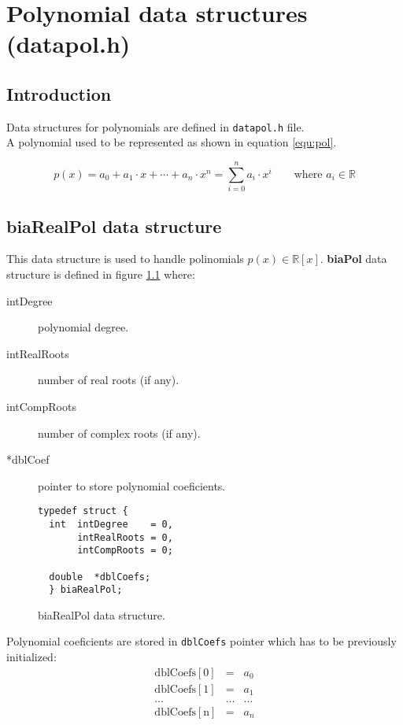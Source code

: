 %
%

\chapter{Polynomial data structures (datapol.h)}

\section{Introduction}

Data structures for polynomials are defined in \texttt{datapol.h} file.\\

A polynomial used to be represented as shown in equation \ref{equ:pol}.

\begin{equation} \label{equ:pol}
p(x) = a_0 + a_1 \cdot x + \cdots + a_n \cdot x^n = \sum_{i=0}^n a_i \cdot x^i \qquad \textrm{where } a_i \in \mathbb{R}
\end{equation}

\section{\textbf{biaRealPol} data structure} \label{sec:biaRealPol}

This data structure is used to handle polinomials $p(x) \in \mathbb{R}[x]$. \textbf{biaPol} data structure is defined in figure \ref{fig:biaRealPol} where:
%
\begin{description}
\item[intDegree] polynomial degree.
\item[intRealRoots] number of real roots (if any).
\item[intCompRoots] number of complex roots (if any).
\item[*dblCoef] pointer to store polynomial coeficients.
\end{description}
%
\begin{figure}[!h]
\begin{verbatim}
typedef struct {
  int  intDegree    = 0,
       intRealRoots = 0,
       intCompRoots = 0;

  double  *dblCoefs;
  } biaRealPol;
\end{verbatim}
\caption{biaRealPol data structure.} \label{fig:biaRealPol}
\end{figure}
%
\FloatBarrier
%
Polynomial coeficients are stored in \texttt{dblCoefs} pointer which has to be previously initialized:
%
\begin{eqnarray*}
  \mathrm{dblCoefs[0]} & = & a_0 \\
  \mathrm{dblCoefs[1]} & = & a_1 \\
  \dots & \dots & \dots \\
  \mathrm{dblCoefs[n]} & = & a_n \\
\end{eqnarray*}

